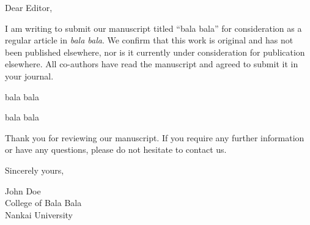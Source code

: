 \documentclass{article}
\begin{document}
\bigskip %

Dear Editor,

\bigskip %


I am writing to submit our manuscript titled ``bala bala'' for consideration as a regular article in \textit{bala bala}. We confirm that this work is original and has not been published elsewhere, nor is it currently under consideration for publication elsewhere. All co-authors have read the manuscript and agreed to submit it in your journal.

bala bala

\vspace{6\baselineskip}

bala bala

\vspace{6\baselineskip}

Thank you for reviewing our manuscript. If you require any further information or have any questions, please do not hesitate to contact us.

\bigskip %

Sincerely yours,

\vspace{20pt} %

John Doe \\
College of Bala Bala \\
Nankai University \\
\end{document}
